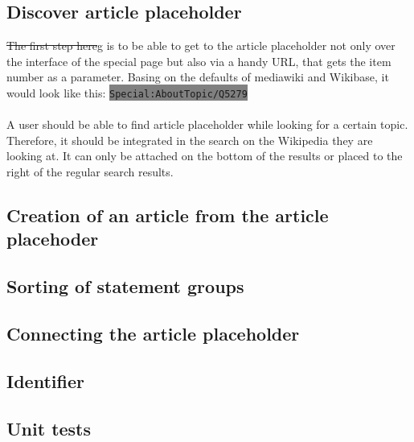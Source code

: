\documentclass[11pt]{article}
\begin{document}
\subsection{Discover article placeholder}
\st{The first step here}g is to be able to get to the article placeholder not only over the interface of the special page but also via a handy URL, that gets the item number as a parameter. Basing on the defaults of mediawiki and Wikibase, it would look like this: \colorbox{Gray}{\lstinline[basicstyle=\ttfamily\color{white}]|Special:AboutTopic/Q5279|} \\
\\
A user should be able to find article placeholder while looking for a certain topic. Therefore, it should be integrated in the search on the Wikipedia they are looking at. It can only be attached on the bottom of the results or placed to the right of the regular search results. %
%

\subsection{Creation of an article from the article placehoder}
%

\subsection{Sorting of statement groups}

%

\subsection{ Connecting the article placeholder }
%

\subsection {Identifier}

\subsection {Unit tests}
\end{document}
